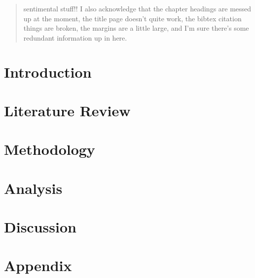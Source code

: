 \documentclass[12pt]{report}
\begin{document}


\begin{abstract}

\end{abstract}

\renewcommand{\abstractname}{Acknowledgements}
\begin{abstract}
sentimental stuff!!
I also acknowledge that the chapter headings are messed up at the moment, the title page doesn't quite work, the bibtex citation things are broken, the margins are a little large, and I'm sure there's some redundant information up in here. 
\end{abstract}

\tableofcontents


\chapter{Introduction}


\chapter{Literature Review}


\chapter{Methodology}


\chapter{Analysis}


\chapter{Discussion}





\chapter{Appendix}
\end{document}
